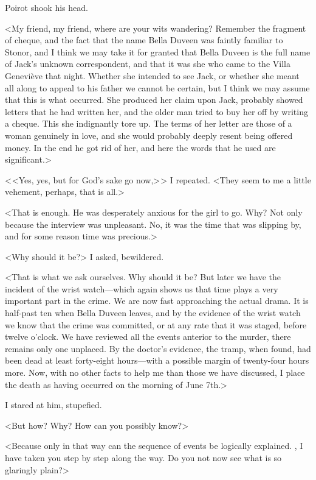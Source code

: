  Poirot shook his head. 

 <My friend, my friend, where are your wits wandering? Remember the fragment of cheque, and the fact that the name Bella Duveen was faintly familiar to Stonor, and I think we may take it for granted that Bella Duveen is the full name of Jack's unknown correspondent, and that it was she who came to the Villa Geneviève that night. Whether she intended to see Jack, or whether she meant all along to appeal to his father we cannot be certain, but I think we may assume that this is what occurred. She produced her claim upon Jack, probably showed letters that he had written her, and the older man tried to buy her off by writing a cheque. This she indignantly tore up. The terms of her letter are those of a woman genuinely in love, and she would probably deeply resent being offered money. In the end he got rid of her, and here the words that he used are significant.> 

 < <Yes, yes, but for God's sake go now,> > I repeated. <They seem to me a little vehement, perhaps, that is all.> 

 <That is enough. He was desperately anxious for the girl to go. Why? Not only because the interview was unpleasant. No, it was the time that was slipping by, and for some reason time was precious.> 

 <Why should it be?> I asked, bewildered. 

 <That is what we ask ourselves. Why should it be? But later we have the incident of the wrist watch—which again shows us that time plays a very important part in the crime. We are now fast approaching the actual drama. It is half-past ten when Bella Duveen leaves, and by the evidence of the wrist watch we know that the crime was committed, or at any rate that it was staged, before twelve o'clock. We have reviewed all the events anterior to the murder, there remains only one unplaced. By the doctor's evidence, the tramp, when found, had been dead at least forty-eight hours—with a possible margin of twenty-four hours more. Now, with no other facts to help me than those we have discussed, I place the death as having occurred on the morning of June 7th.> 

 I stared at him, stupefied. 

 <But how? Why? How can you possibly know?> 

 <Because only in that way can the sequence of events be logically explained. , I have taken you step by step along the way. Do you not now see what is so glaringly plain?> 

